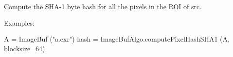 \begin{comment}
Count how many pixels in the image (within the ROI) are outside the
value range described by {\cf low[roi.chbegin..roi.chend-1]} and
{\cf high[roi.chbegin..roi.chend-1]} 
as the low and high acceptable values for each color channel.  

The number of pixels containing values that fall below the lower bound
will be stored in {\cf *lowcount}, the number of pixels containing
values that fall above the upper bound will be stored in 
{\cf *highcount}, and the number of pixels for which all channels fell
within the bounds will be stored in {\cf *inrangecount}.  Any of these
may be NULL, which simply means that the counts need not be collected or
stored.

\smallskip
\noindent Examples:
\begin{code}
    A = ImageBuf ("a.exr")
    ROI roi = get_roi (A.spec())
    roi.chend = std::min (roi.chend, 4);  # only compare RGBA

    float low[] = {0, 0, 0, 0};
    float high[] = {1, 1, 1, 1};

    imagesize_t lowcount, highcount, inrangecount;
    ImageBufAlgo.color_range_check (A, &lowcount, &highcount, &inrangecount,
                                     low, high, roi);
    print lowcount, " pixels had components < 0"
    print highcount, " pixels had components > 1"
    print inrangecount, " pixels were fully within [0,1] range"
\end{code}
\apiend
\end{comment}


 

Compute the SHA-1 byte hash for all the pixels in the ROI of {\cf src}.

\smallskip
\noindent Examples:
\begin{code}
    A = ImageBuf ("a.exr")
    hash = ImageBufAlgo.computePixelHashSHA1 (A, blocksize=64)
\end{code}
\apiend


\begin{comment}
\apiitem{bool {\ce histogram} (src, int channel, \\
  \bigspc std::vector<imagesize_t> \&histogram, int bins=256, \\
  \bigspc float min=0, float max=1, imagesize_t *submin=NULL, \\
  \bigspc imagesize_t *supermax=NULL, roi=ROI.All)}
\index{ImageBufAlgo!histogram} \indexapi{histogram}
\apiend
\end{comment}



